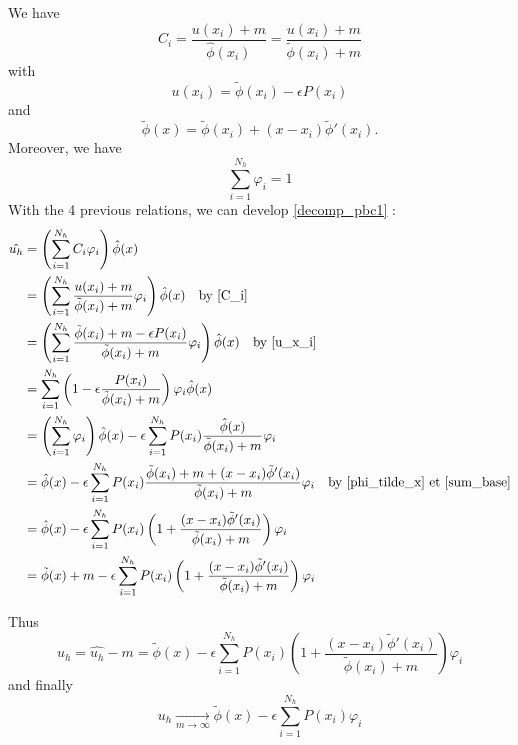 We have 
\begin{equation}
	C_i=\frac{u(x_i)+m}{\hat{\phi}(x_i)}=\frac{u(x_i)+m}{\tilde{\phi}(x_i)+m} \label{C_i}
\end{equation}
with
\begin{equation}
	u(x_i)=\tilde{\phi}(x_i)-\epsilon P(x_i) \label{u_x_i}
\end{equation}
and
\begin{equation}
	\tilde{\phi}(x)=\tilde{\phi}(x_i)+(x-x_i)\tilde{\phi}'(x_i). \label{phi_tilde_x}
\end{equation}
Moreover, we have 
\begin{equation}
	\sum_{i=1}^{N_h}\varphi_i=1 \label{sum_base}
\end{equation}
With the 4 previous relations, we can develop \ref{decomp_pbc1} :
\begin{align*}
	\hat{u_h}&=\left(\sum_{i=1}^{N_h}C_i\varphi_i\right)\hat{\phi}(x) \\
	&=\left(\sum_{i=1}^{N_h}\frac{u(x_i)+m}{\tilde{\phi}(x_i)+m}\varphi_i\right)\hat{\phi}(x) \quad \text{by \ref{C_i}} \\
	&=\left(\sum_{i=1}^{N_h}\frac{\tilde{\phi}(x_i)+m-\epsilon P(x_i)}{\tilde{\phi}(x_i)+m}\varphi_i\right)\hat{\phi}(x) \quad \text{by \ref{u_x_i}} \\
	&=\sum_{i=1}^{N_h}\left(1-\epsilon\frac{ P(x_i)}{\tilde{\phi}(x_i)+m}\right)\varphi_i\hat{\phi}(x) \\
	&=\left(\sum_{i=1}^{N_h}\varphi_i\right)\hat{\phi}(x)-\epsilon\sum_{i=1}^{N_h}P(x_i)\frac{\hat{\phi}(x)}{\tilde{\phi}(x_i)+m}\varphi_i \\
	&=\hat{\phi}(x)-\epsilon\sum_{i=1}^{N_h}P(x_i)\frac{\tilde{\phi}(x_i)+m+(x-x_i)\tilde{\phi}'(x_i)}{\tilde{\phi}(x_i)+m}\varphi_i \quad \text{by \ref{phi_tilde_x} et \ref{sum_base}} \\
	&=\hat{\phi}(x)-\epsilon\sum_{i=1}^{N_h}P(x_i)\left(1+\frac{(x-x_i)\tilde{\phi}'(x_i)}{\tilde{\phi}(x_i)+m}\right)\varphi_i \\
	&=\tilde{\phi}(x)+m-\epsilon\sum_{i=1}^{N_h}P(x_i)\left(1+\frac{(x-x_i)\tilde{\phi}'(x_i)}{\tilde{\phi}(x_i)+m}\right)\varphi_i \\
\end{align*}

Thus
\begin{equation*}
	u_h=\hat{u_h}-m=\tilde{\phi}(x)-\epsilon\sum_{i=1}^{N_h}P(x_i)\left(1+\frac{(x-x_i)\tilde{\phi}'(x_i)}{\tilde{\phi}(x_i)+m}\right)\varphi_i
\end{equation*}
and finally
\begin{equation}
	u_h\xrightarrow[m\to\infty]{} \tilde{\phi}(x)-\epsilon\sum_{i=1}^{N_h}P(x_i)\varphi_i \label{result1}
\end{equation}

